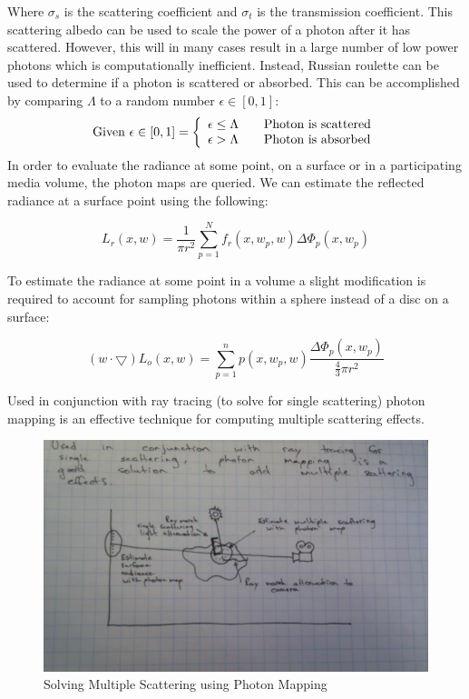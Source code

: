 \documentclass{article}
\begin{document}
Where $\sigma_{s}$ is the scattering coefficient and $\sigma_{t}$ is the transmission coefficient. This scattering albedo can be used to scale the power of a photon after it has scattered. However, this will in many cases result in a large number of low power photons which is computationally inefficient. Instead, Russian roulette\cite{Arvo:1990:PTI:97880.97886} can be used to determine if a photon is scattered or absorbed. This can be accomplished by comparing $\Lambda$ to a random number $\epsilon \in [0,1]$:
\newline \newline
\[
  \text{Given $\epsilon \in [0,1]$} = \left\{ 
  \begin{array}{l l}
    \epsilon \leq \Lambda  & \quad \text{Photon is scattered}\\
    \epsilon > \Lambda & \quad \text{Photon is absorbed}\\
  \end{array} \right.
\]
\newline \newline
In order to evaluate the radiance at some point, on a surface or in a participating media volume, the photon maps are queried. We can estimate the reflected radiance at a surface point using the following:

\begin{equation}
L_{r}(x, w) = \frac{1}{\pi r^{2}}\displaystyle\sum_{p=1}^{N}f_{r}(x,w_{p},w)\Delta\Phi_{p}(x,w_{p})
\end{equation}

To estimate the radiance at some point in a volume a slight modification is required to account for sampling photons within a sphere instead of a disc on a surface:

\begin{equation}
(w\cdot \bigtriangledown)L_{o}(x, w) = \displaystyle\sum_{p=1}^{n}p(x,w_{p},w)\frac{\Delta\Phi_{p}(x,w_{p})}{\frac{4}{3}\pi r^{2}}
\end{equation}

Used in conjunction with ray tracing (to solve for single scattering) photon mapping is an effective technique for computing multiple scattering effects.

\begin{figure}[h!]
	\centering
	\includegraphics[scale=0.5]{Images/MultipleScatteringWithPhotonMapping}
	\caption{Solving Multiple Scattering using Photon Mapping}
\end{figure}
\end{document}
